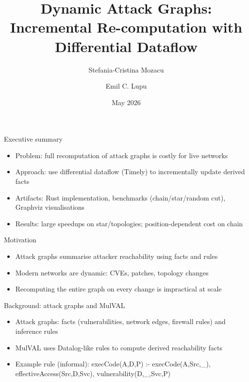 \documentclass[professionalfonts]{beamer}
\title[Dynamic Attack Graphs]{Dynamic Attack Graphs: Incremental Re-computation with Differential Dataflow}
\author{Stefania‑Cristina Mozacu \and Emil C. Lupu}
\institute{\small Department / Affiliation}
\date{\small May 2026}
\begin{document}
\begin{frame}
  \titlepage
\end{frame}

\begin{frame}{Executive summary}
  \begin{itemize}
    \item Problem: full recomputation of attack graphs is costly for live networks
    \item Approach: use differential dataflow (Timely) to incrementally update derived facts
    \item Artifacts: Rust implementation, benchmarks (chain/star/random cut), Graphviz visualisations
    \item Results: large speedups on star/topologies; position-dependent cost on chain
  \end{itemize}
\end{frame}

\begin{frame}{Motivation}
  \begin{itemize}
    \item Attack graphs summarise attacker reachability using facts and rules
    \item Modern networks are dynamic: CVEs, patches, topology changes
    \item Recomputing the entire graph on every change is impractical at scale
  \end{itemize}
\end{frame}

\begin{frame}{Background: attack graphs and MulVAL}
  \begin{itemize}
    \item Attack graphs: facts (vulnerabilities, network edges, firewall rules) and inference rules
    \item MulVAL uses Datalog-like rules to compute derived reachability facts
    \item Example rule (informal): execCode(A,D,P) :- execCode(A,Src,_), effectiveAccess(Src,D,Svc), vulnerability(D,_,Svc,P)
  \end{itemize}
\end{frame}
\end{document}
